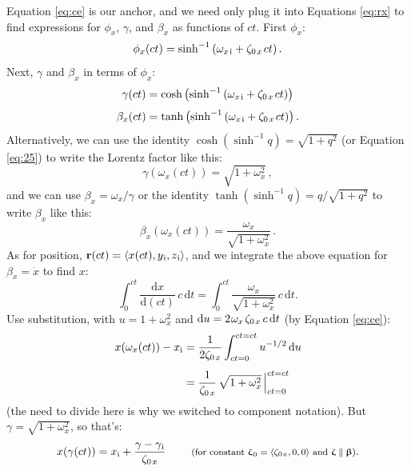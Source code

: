 \documentclass[12pt]{article}
\renewcommand{\vv}[1]{\mathbf{#1}}
\newcommand{\dd}[1]{\mathrm{d}#1}
\newcommand{\vvbeta}{\bm{\upbeta}}
\newcommand{\vvzeta}{\bm{\upzeta}}
\begin{document}
Equation \ref{eq:ce} is our anchor, and we need only plug it into Equations \ref{eq:rx} to find expressions for $\phi_x$, $\gamma$, and $\beta_x$ as functions of $ct$. First $\phi_x$:
\begin{equation*}
\phi_x (ct) = \sinh^{-1} \left( \omega_{x \mkern2mu \textrm{i}} + \zeta_{0 \mkern2mu x} \mkern2mu ct \right) .
\end{equation*}
Next, $\gamma$ and $\beta_x$ in terms of $\phi_x$:
\begin{equation*}
\gamma (ct) = \cosh \left( \sinh^{-1} \left( \omega_{x \mkern2mu \textrm{i}} + \zeta_{0 \mkern2mu x} \mkern2mu ct \right)  \right)
\end{equation*}
\begin{equation*}
\beta_x (ct) = \tanh \left( \sinh^{-1} \left( \omega_{x \mkern2mu \textrm{i}} + \zeta_{0 \mkern2mu x} \mkern2mu ct \right) \right).
\end{equation*}
Alternatively, we can use the identity $\cosh{(\sinh^{-1} q) = \sqrt{1 + q^2}}$ (or Equation \ref{eq:25}) to write the Lorentz factor like this:
\begin{equation*}
\gamma (\omega_x(ct)) = \sqrt{1 + \omega^2_x} \, ,
\end{equation*}
and we can use $\beta_x = \omega_x / \gamma$ or the identity $\tanh{(\sinh^{-1} q)} = q / \sqrt{1 + q^2}$ to write $\beta_x$ like this:
\begin{equation*}
\beta_x (\omega_x(ct)) = \dfrac{\omega_x}{\sqrt{1 + \omega^2_x}} \, .
\end{equation*}
As for position, $\vv r (ct) = \langle x (ct) , y_{\mkern1mu \mathrm{i}}, z_{\mkern1mu \mathrm{i}} \rangle$, and we integrate the above equation for $\beta_x = \dot{x}$ to find $x$:
\begin{equation*}
\int_0^{ct} \dfrac{\dd x}{\dd (ct)} \, c \, \dd t = \int_0^{ct} \dfrac{\omega_x}{\sqrt{1 + \omega^2_x}} \, c \, \dd t .
\end{equation*}
Use substitution, with $u = 1 + \omega^2_x$ and $\dd u = 2 \mkern1mu \omega_x \mkern2mu \zeta_{0 \mkern2mu x} \, c \, \dd t$ (by Equation \ref{eq:ce}):
\begin{equation*}
\begin{split}
x (\omega_x(ct)) - x_{\mathrm{i}} &= \dfrac{1}{2 \zeta_{0 \mkern2mu x}} \int_{ct = 0}^{ct = ct} u^{-1/2} \, \dd u \\[5pt]
&= \dfrac{1}{ \zeta_{0 \mkern2mu x}} \, \sqrt{1 + \omega^2_x } \, \Big \vert^{ct = ct}_{ct = 0}
\end{split}
\end{equation*}
(the need to divide here is why we switched to component notation). But $\gamma = \sqrt{1 + \omega^2_x}$, so that's:
\begin{equation}\label{eq:x}
x (\gamma(ct)) = x_{\mathrm{i}} + \dfrac{ \gamma - \gamma_{\mkern1mu \mathrm{i}} }{ \zeta_{0 \mkern2mu x}} \qquad \textrm{\footnotesize{ (for constant $\vvzeta_{\mkern1mu 0} = \langle \zeta_{0 \mkern1mu x} , 0, 0 \rangle$ and $\vvzeta \parallel \vvbeta$)}}.
\end{equation}
\end{document}
